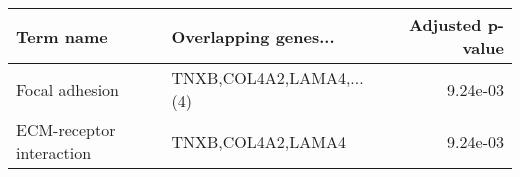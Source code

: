 \begin{tabular}{llr}
\toprule
               Term name &     Overlapping genes... &  Adjusted p-value \\
\midrule
          Focal adhesion & TNXB,COL4A2,LAMA4,...(4) &          9.24e-03 \\
ECM-receptor interaction &        TNXB,COL4A2,LAMA4 &          9.24e-03 \\
\bottomrule
\end{tabular}
